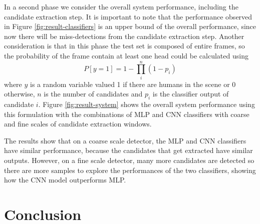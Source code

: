     \begin{figure*}[!t]
    \centering
    \label{fig:result-classifiers-all}
    \hfil
    \label{fig:result-classifiers-all-zoom}
    \caption{Classifiers performance.}
    \label{fig:result-classifiers}
    \end{figure*}

    In a second phase we consider the overall system performance, including the candidate extraction step. It is important to note that the performance observed in Figure \ref{fig:result-classifiers} is an upper bound of the overall performance, since now there will be miss-detections from the candidate extraction step. Another consideration is that in this phase the test set is composed of entire frames, so the probability of the frame contain at least one head could be calculated using
    \begin{equation}
    P[y=1] = 1 - \prod_i^n (1-p_i)
    \end{equation}
    where $y$ is a random variable valued 1 if there are humans in the scene or 0 otherwise, $n$ is the number of candidates and $p_i$ is the classifier output of candidate $i$. Figure \ref{fig:result-system} shows the overall system performance using this formulation with the combinations of MLP and CNN classifiers with coarse and fine scales of candidate extraction windows.

    The results show that on a coarse scale detector, the MLP and CNN classifiers have similar performance, because the candidates that get extracted have similar outputs. However, on a fine scale detector, many more candidates are detected so there are more samples to explore the performances of the two classifiers, showing how the CNN model outperforms MLP.

    \begin{figure*}[!t]
    \centering
    \label{fig:result-system-all}
    \hfil
    \label{fig:result-system-all-zoom}
    \caption{Overall system performance.}
    \label{fig:result-system}
    \end{figure*}

\section{Conclusion}
\label{sec:conclusion}

